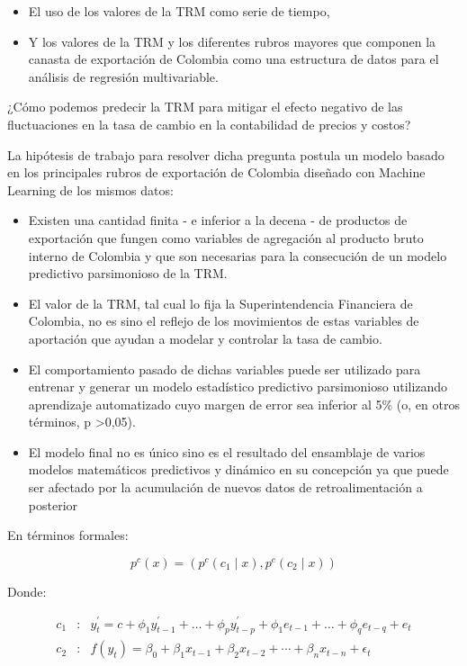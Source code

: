 \begin{itemize}
\item El uso de los valores de la TRM como serie de tiempo,
\item Y los valores de la TRM y los diferentes rubros mayores que componen la canasta de exportación de Colombia como una estructura de datos para el análisis de regresión multivariable.
\end{itemize}

¿Cómo podemos predecir la TRM para mitigar el efecto negativo de las fluctuaciones en la tasa de cambio en la contabilidad de precios y costos?

La hipótesis de trabajo para resolver dicha pregunta postula un modelo basado en los principales rubros de exportación de Colombia diseñado con Machine Learning de los mismos datos:
\begin{itemize}
\item Existen una cantidad finita - e inferior a la decena - de productos de exportación que fungen como variables de agregación al producto bruto interno de Colombia y que son necesarias para la consecución de un modelo predictivo parsimonioso de la TRM.
\item El valor de la TRM, tal cual lo fija la Superintendencia Financiera de Colombia, no es sino el reflejo de los movimientos de estas variables de aportación que ayudan a modelar y controlar la tasa de cambio.
\item El comportamiento pasado de dichas variables puede ser utilizado para entrenar y generar un modelo estadístico predictivo parsimonioso utilizando aprendizaje automatizado cuyo margen de error sea inferior al 5\% (o, en otros términos, p \textgreater 0,05).
\item El modelo final no es único sino es el resultado del ensamblaje de varios modelos matemáticos predictivos y dinámico en su concepción ya que puede ser afectado por la acumulación de nuevos datos de retroalimentación a posterior 
\end{itemize}

En términos formales:

\begin{equation}
    p^{c}(x) = (p^{c}(c_{1} \mid x),p^{c}(c_{2} \mid x))
\end{equation}

Donde:

\begin{eqnarray}
    c_{1} & : & y_{t}^{\prime} = c + \phi_{1}y_{t-1}^{\prime} + \ldots + \phi_{p}y_{t-p}^{\prime} + \phi_{1}e_{t-1} + \ldots + \phi_{q}e_{t-q} + e_{t} \\
    c_{2} & : & f(y_{t}) = \beta_{0} + \beta_{1}x_{t-1} + \beta_{2}x_{t-2} + \cdots + \beta_{n}x_{t-n} + \epsilon_{t}
\end{eqnarray}

